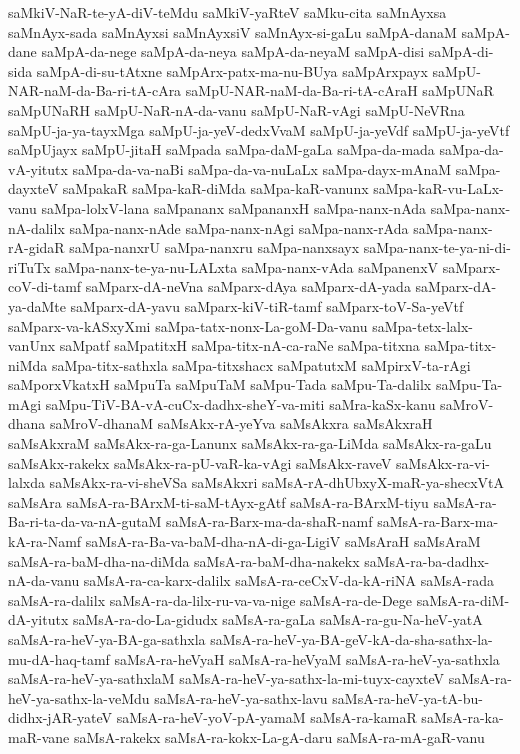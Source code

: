 {saMkiV-NaR-te-yA-diV-teMdu
saMkiV-yaRteV
saMku-cita
saMnAyxsa
saMnAyx-sada
saMnAyxsi
saMnAyxsiV
saMnAyx-si-gaLu
saMpA-danaM
saMpA-dane
saMpA-da-nege
saMpA-da-neya
saMpA-da-neyaM
saMpA-disi
saMpA-di-sida
saMpA-di-su-tAtxne
saMpArx-patx-ma-nu-BUya
saMpArxpayx
saMpU-NAR-naM-da-Ba-ri-tA-cAra
saMpU-NAR-naM-da-Ba-ri-tA-cAraH
saMpUNaR
saMpUNaRH
saMpU-NaR-nA-da-vanu
saMpU-NaR-vAgi
saMpU-NeVRna
saMpU-ja-ya-tayxMga
saMpU-ja-yeV-dedxVvaM
saMpU-ja-yeVdf
saMpU-ja-yeVtf
saMpUjayx
saMpU-jitaH
saMpada
saMpa-daM-gaLa
saMpa-da-mada
saMpa-da-vA-yitutx
saMpa-da-va-naBi
saMpa-da-va-nuLaLx
saMpa-dayx-mAnaM
saMpa-dayxteV
saMpakaR
saMpa-kaR-diMda
saMpa-kaR-vanunx
saMpa-kaR-vu-LaLx-vanu
saMpa-lolxV-lana
saMpananx
saMpananxH
saMpa-nanx-nAda
saMpa-nanx-nA-dalilx
saMpa-nanx-nAde
saMpa-nanx-nAgi
saMpa-nanx-rAda
saMpa-nanx-rA-gidaR
saMpa-nanxrU
saMpa-nanxru
saMpa-nanxsayx
saMpa-nanx-te-ya-ni-di-riTuTx
saMpa-nanx-te-ya-nu-LALxta
saMpa-nanx-vAda
saMpanenxV
saMparx-coV-di-tamf
saMparx-dA-neVna
saMparx-dAya
saMparx-dA-yada
saMparx-dA-ya-daMte
saMparx-dA-yavu
saMparx-kiV-tiR-tamf
saMparx-toV-Sa-yeVtf
saMparx-va-kASxyXmi
saMpa-tatx-nonx-La-goM-Da-vanu
saMpa-tetx-lalx-vanUnx
saMpatf
saMpatitxH
saMpa-titx-nA-ca-raNe
saMpa-titxna
saMpa-titx-niMda
saMpa-titx-sathxla
saMpa-titxshacx
saMpatutxM
saMpirxV-ta-rAgi
saMporxVkatxH
saMpuTa
saMpuTaM
saMpu-Tada
saMpu-Ta-dalilx
saMpu-Ta-mAgi
saMpu-TiV-BA-vA-cuCx-dadhx-sheY-va-miti
saMra-kaSx-kanu
saMroV-dhana
saMroV-dhanaM
saMsAkx-rA-yeYva
saMsAkxra
saMsAkxraH
saMsAkxraM
saMsAkx-ra-ga-Lanunx
saMsAkx-ra-ga-LiMda
saMsAkx-ra-gaLu
saMsAkx-rakekx
saMsAkx-ra-pU-vaR-ka-vAgi
saMsAkx-raveV
saMsAkx-ra-vi-lalxda
saMsAkx-ra-vi-sheVSa
saMsAkxri
saMsA-rA-dhUbxyX-maR-ya-shecxVtA
saMsAra
saMsA-ra-BArxM-ti-saM-tAyx-gAtf
saMsA-ra-BArxM-tiyu
saMsA-ra-Ba-ri-ta-da-va-nA-gutaM
saMsA-ra-Barx-ma-da-shaR-namf
saMsA-ra-Barx-ma-kA-ra-Namf
saMsA-ra-Ba-va-baM-dha-nA-di-ga-LigiV
saMsAraH
saMsAraM
saMsA-ra-baM-dha-na-diMda
saMsA-ra-baM-dha-nakekx
saMsA-ra-ba-dadhx-nA-da-vanu
saMsA-ra-ca-karx-dalilx
saMsA-ra-ceCxV-da-kA-riNA
saMsA-rada
saMsA-ra-dalilx
saMsA-ra-da-lilx-ru-va-va-nige
saMsA-ra-de-Dege
saMsA-ra-diM-dA-yitutx
saMsA-ra-do-La-gidudx
saMsA-ra-gaLa
saMsA-ra-gu-Na-heV-yatA
saMsA-ra-heV-ya-BA-ga-sathxla
saMsA-ra-heV-ya-BA-geV-kA-da-sha-sathx-la-mu-dA-haq-tamf
saMsA-ra-heVyaH
saMsA-ra-heVyaM
saMsA-ra-heV-ya-sathxla
saMsA-ra-heV-ya-sathxlaM
saMsA-ra-heV-ya-sathx-la-mi-tuyx-cayxteV
saMsA-ra-heV-ya-sathx-la-veMdu
saMsA-ra-heV-ya-sathx-lavu
saMsA-ra-heV-ya-tA-bu-didhx-jAR-yateV
saMsA-ra-heV-yoV-pA-yamaM
saMsA-ra-kamaR
saMsA-ra-ka-maR-vane
saMsA-rakekx
saMsA-ra-kokx-La-gA-daru
saMsA-ra-mA-gaR-vanu
}
